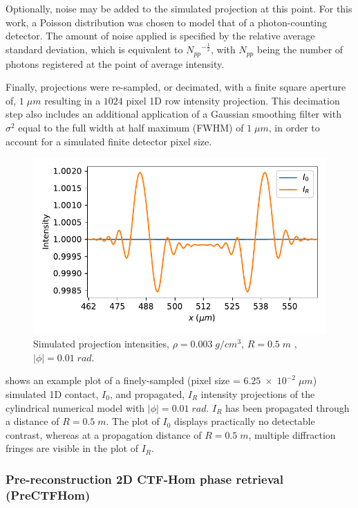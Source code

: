 \documentclass[twocolumn, switch]{article} %
\begin{document}
Optionally, noise may be added to the simulated projection at this point. For this work, a Poisson distribution was chosen to model that of a photon-counting detector. The amount of noise applied is specified by the relative average standard deviation, which is equivalent to ${N_{pp}}^{-\frac{1}{2}}$, with ${N_{pp}}$ being the number of photons registered at the point of average intensity.

Finally, projections were re-sampled, or decimated, with a finite square aperture of, $1\;\mu m$ resulting in a $1024$ pixel 1D row intensity projection. This decimation step also includes an additional application of a Gaussian smoothing filter with ${\sigma ^2}$ equal to the full width at half maximum (FWHM) of $1\;\mu m$, in order to account for a simulated finite detector pixel size.

\begin{figure}[!htbp]
    \centering
        \includegraphics[width=\linewidth]{simulated_projection.pdf}%
        \caption{Simulated projection intensities, $\rho=0.003\;g/cm^3$, $R=0.5\;m$ , $|\phi|= 0.01\;rad$.}
        \label{fig3.simulated_projection_intensity}
\end{figure}

 shows an example plot of a finely-sampled (pixel size = $6.25 \;\times\;{10^{-2}}\;\mu m$) simulated 1D contact, $I_0$, and propagated, $I_R$ intensity projections of the cylindrical numerical model with  $|\phi|= 0.01\;rad$. $I_R$ has been propagated through a distance of $R=0.5\;m$. The plot of $I_0$ displays practically no detectable contrast, whereas at a propagation distance of $R=0.5\;m$, multiple diffraction fringes are visible in the plot of $I_R$.

\subsubsection{Pre-reconstruction 2D CTF-Hom phase retrieval (PreCTFHom)}\label{s3:pre-ctfhom-2d}
\end{document}
